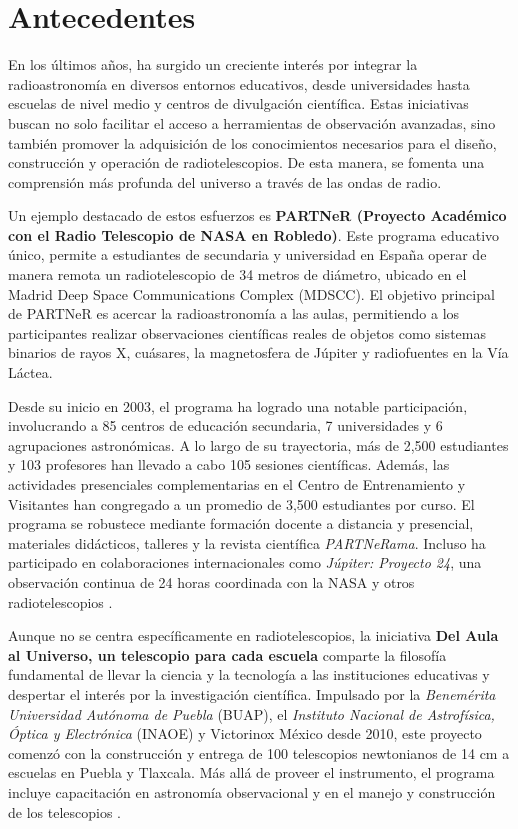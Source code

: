 \section{Antecedentes}

En los últimos años, ha surgido un creciente interés por integrar la
radioastronomía en diversos entornos educativos, desde universidades hasta
escuelas de nivel medio y centros de divulgación científica.
Estas iniciativas buscan no solo facilitar el acceso a herramientas de
observación avanzadas, sino también promover la adquisición de los
conocimientos necesarios para el diseño, construcción y operación de
radiotelescopios.
De esta manera, se fomenta una comprensión más profunda del universo a través
de las ondas de radio.

Un ejemplo destacado de estos esfuerzos es \textbf{PARTNeR (Proyecto Académico
con el Radio Telescopio de NASA en Robledo)}.
Este programa educativo único,  permite a estudiantes de secundaria y universidad
en España operar de manera remota un radiotelescopio de 34 metros de diámetro,
ubicado en el Madrid Deep Space Communications Complex (MDSCC).
El objetivo principal de PARTNeR es acercar la radioastronomía a las aulas,
permitiendo a los participantes realizar observaciones científicas reales de
objetos como sistemas binarios de rayos X, cuásares, la magnetosfera de Júpiter
y radiofuentes en la Vía Láctea.

Desde su inicio en 2003, el programa ha logrado una notable participación,
involucrando a 85 centros de educación secundaria, 7 universidades y 6
agrupaciones astronómicas.
A lo largo de su trayectoria, más de 2,500 estudiantes y 103 profesores han
llevado a cabo 105 sesiones científicas.
Además, las actividades presenciales complementarias en el Centro de
Entrenamiento y Visitantes han congregado a un promedio de 3,500 estudiantes
por curso.
El programa se robustece mediante formación docente a distancia y presencial,
materiales didácticos, talleres y la revista científica \textit{PARTNeRama}.
Incluso ha participado en colaboraciones internacionales como \textit{Júpiter:
Proyecto 24}, una observación continua de 24 horas coordinada con la NASA
y otros radiotelescopios \cite{Vaquerizo2010}.

Aunque no se centra específicamente en radiotelescopios, la iniciativa
\textbf{Del Aula al Universo, un telescopio para cada escuela} comparte la
filosofía fundamental de llevar la ciencia y la tecnología a las instituciones
educativas y despertar el interés por la investigación científica.
Impulsado por la \emph{Benemérita Universidad Autónoma de Puebla} (BUAP), el
\emph{Instituto Nacional de Astrofísica, Óptica y Electrónica} (INAOE)
y Victorinox México desde 2010, este proyecto comenzó con la construcción
y entrega de 100 telescopios newtonianos de 14 cm a escuelas en Puebla
y Tlaxcala.
Más allá de proveer el instrumento, el programa incluye capacitación en
astronomía observacional y en el manejo y construcción de los telescopios
\cite{DifusiondelaCienciaylaTecnologia2011}.

